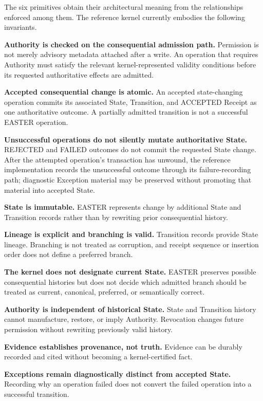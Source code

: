 \documentclass[11pt]{article}
\begin{document}
The six primitives obtain their architectural meaning from the relationships enforced among them. The reference kernel currently embodies the following invariants.

\textbf{Authority is checked on the consequential admission path.} Permission is not merely advisory metadata attached after a write. An operation that requires Authority must satisfy the relevant kernel-represented validity conditions before its requested authoritative effects are admitted.

\textbf{Accepted consequential change is atomic.} An accepted state-changing operation commits its associated State, Transition, and ACCEPTED Receipt as one authoritative outcome. A partially admitted transition is not a successful EASTER operation.

\textbf{Unsuccessful operations do not silently mutate authoritative State.} REJECTED and FAILED outcomes do not commit the requested State change. After the attempted operation's transaction has unwound, the reference implementation records the unsuccessful outcome through its failure-recording path; diagnostic Exception material may be preserved without promoting that material into accepted State.

\textbf{State is immutable.} EASTER represents change by additional State and Transition records rather than by rewriting prior consequential history.

\textbf{Lineage is explicit and branching is valid.} Transition records provide State lineage. Branching is not treated as corruption, and receipt sequence or insertion order does not define a preferred branch.

\textbf{The kernel does not designate current State.} EASTER preserves possible consequential histories but does not decide which admitted branch should be treated as current, canonical, preferred, or semantically correct.

\textbf{Authority is independent of historical State.} State and Transition history cannot manufacture, restore, or imply Authority. Revocation changes future permission without rewriting previously valid history.

\textbf{Evidence establishes provenance, not truth.} Evidence can be durably recorded and cited without becoming a kernel-certified fact.

\textbf{Exceptions remain diagnostically distinct from accepted State.} Recording why an operation failed does not convert the failed operation into a successful transition.
\end{document}
